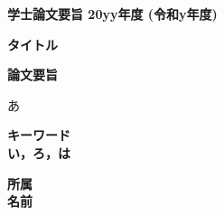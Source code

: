 \begin{center}
  \textbf{\Large 学士論文要旨 20yy年度 (令和y年度)}
  
  \vspace{6.18mm}
  
  \textbf{\large タイトル}
  
\end{center}

\vspace{10mm}

\begin{flushleft}
  \textbf{論文要旨}\\
\end{flushleft}
あ

\begin{flushleft}
  \textbf{キーワード}\\
  \textbf{い，ろ，は}
  
\end{flushleft}

\begin{flushright}
  \textbf{所属}\\
  \textbf{名前}
\end{flushright}
\newpage

